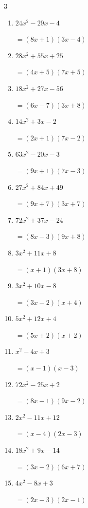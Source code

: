 \begin{multicols}{3}
\begin{enumerate}
        $=(4x+5)(5x-9)$

  \item $24x^{2}-29x-4$

        $=(8x+1)(3x-4)$

  \item $28x^{2}+55x+25$

        $=(4x+5)(7x+5)$

  \item $18x^{2}+27x-56$

        $=(6x-7)(3x+8)$

  \item $14x^{2}+3x-2$

        $=(2x+1)(7x-2)$

  \item $63x^{2}-20x-3$

        $=(9x+1)(7x-3)$

\columnbreak %

  \item $27x^{2}+84x+49$

        $=(9x+7)(3x+7)$

  \item $72x^{2}+37x-24$

        $=(8x-3)(9x+8)$

  \item $3x^{2}+11x+8$

        $=(x+1)(3x+8)$

  \item $3x^{2}+10x-8$

        $=(3x-2)(x+4)$

  \item $5x^{2}+12x+4$

        $=(5x+2)(x+2)$

  \item $x^{2}-4x+3$

        $=(x-1)(x-3)$

  \item $72x^{2}-25x+2$

        $=(8x-1)(9x-2)$

  \item $2x^{2}-11x+12$

        $=(x-4)(2x-3)$

  \item $18x^{2}+9x-14$

        $=(3x-2)(6x+7)$

  \item $4x^{2}-8x+3$

        $=(2x-3)(2x-1)$


\end{enumerate}
\end{multicols}

